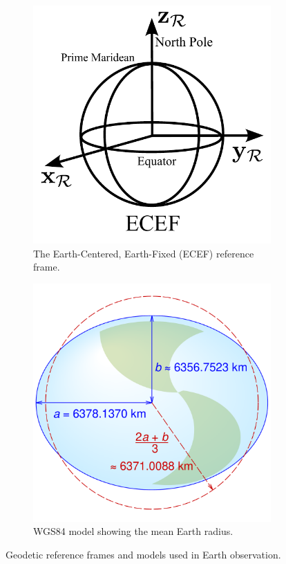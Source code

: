\begin{figure}[H]
    \centering
    \begin{subfigure}[t]{0.45\textwidth}
        \centering
        \includegraphics[width=\textwidth]{figures/modelling/ECEF.pdf}
        \caption{The Earth-Centered, Earth-Fixed (ECEF) reference frame.}
        \label{fig:ecef}
    \end{subfigure}
    \hfill
    \begin{subfigure}[t]{0.45\textwidth}
        \centering
        \includegraphics[width=\textwidth]{figures/modelling/WGS84_mean_Earth_radius.pdf}
        \caption{WGS84 model showing the mean Earth radius.}
        \label{fig:wgs84}
    \end{subfigure}
    \caption{Geodetic reference frames and models used in Earth observation.}
    \label{fig:geodetic-frames}
\end{figure}


